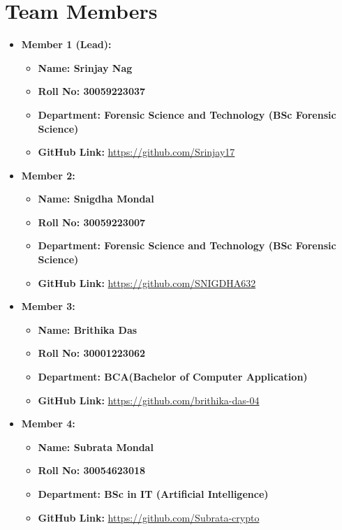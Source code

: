\documentclass[a4paper,15pt]{article}
\begin{document}
\section*{Team Members}
\begin{itemize}[leftmargin=1.5cm]
    \item \textbf{Member 1 (Lead):} 
    \begin{itemize}[leftmargin=1.5cm]
        \item \textbf{Name: Srinjay Nag} 
        \item \textbf{Roll No: 30059223037}
        \item \textbf{Department: Forensic Science and Technology (BSc Forensic Science)} 
        \item \textbf{GitHub Link:} \url{https://github.com/Srinjay17}
\end{itemize}

\item \textbf{Member 2:} 
    \begin{itemize}[leftmargin=1.5cm]
        \item \textbf{Name: Snigdha Mondal  } 
        \item \textbf{Roll No: 30059223007 } 
        \item \textbf{Department: Forensic Science and Technology (BSc Forensic Science) } 
        \item \textbf{GitHub Link:} \url{https://github.com/SNIGDHA632}
    \end{itemize}

    \item \textbf{Member 3:} 
    \begin{itemize}[leftmargin=1.5cm]
        \item \textbf{Name: Brithika Das } 
        \item \textbf{Roll No: 30001223062  } 
        \item \textbf{Department: BCA(Bachelor of Computer Application) } 
        \item \textbf{GitHub Link:} \url{https://github.com/brithika-das-04}
    \end{itemize}

    \item \textbf{Member 4:} 
    \begin{itemize}[leftmargin=1.5cm]
        \item \textbf{Name: Subrata Mondal } 
        \item \textbf{Roll No: 30054623018 } 
        \item \textbf{Department: BSc in IT (Artificial Intelligence) } 
        \item \textbf{GitHub Link:} \url{https://github.com/Subrata-crypto}
    \end{itemize}


\end{itemize}
\end{document}
